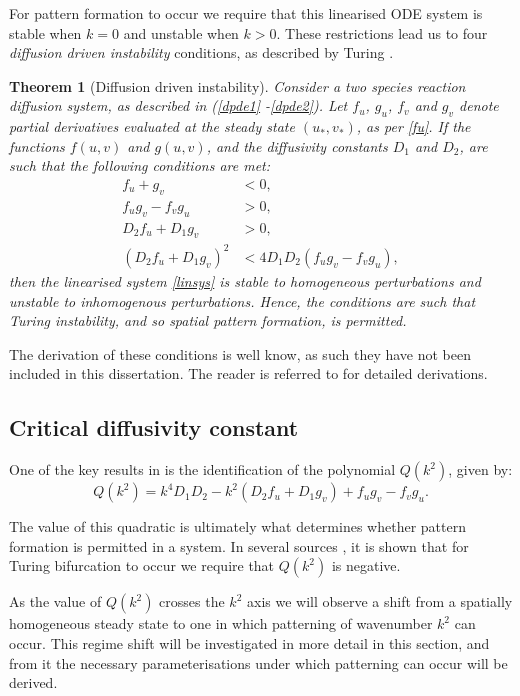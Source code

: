 \documentclass[12pt]{article}
\newtheorem{theorem}{Theorem}[section]
\begin{document}
For pattern formation to occur we require that this linearised ODE system is stable when $k=0$ and unstable when $k>0$. These restrictions lead us to four \textit{diffusion driven instability} conditions, as described by Turing
\cite{Turing}.
\begin{theorem}[Diffusion driven instability]
Consider a two species reaction diffusion system, as described in (\ref{dpde1} -\ref{dpde2}). Let $f_u$, $g_u$, $f_v$ and $g_v$ denote partial derivatives evaluated at the steady state $(u_{\ast}, v_{\ast})$, as per \eqref{fu}. If the functions $f(u,v)$ and $g(u,v)$, and the diffusivity constants $D_1$ and $D_2$, are such that the following conditions are met:
\begin{align}
    \label{DDI1} f_u + g_v &< 0,\\
    \label{DDI2} f_ug_v - f_vg_u &> 0,\\
    \label{DDI3} D_2f_u + D_1g_v &> 0,\\
    \label{DDI4} (D_2f_u + D_1g_v)^2 &< 4D_1D_2(f_ug_v - f_vg_u),
\end{align}
then the linearised system \eqref{linsys} is stable to homogeneous perturbations and unstable to inhomogenous perturbations. Hence, the conditions are such that Turing instability, and so spatial pattern formation, is permitted. 
\end{theorem}
The derivation of these conditions is well know, as such they have not been included in this dissertation. The reader is referred to \cite{Britton, Murray} for detailed derivations. 

\subsection{Critical diffusivity constant}
One of the key results in \cite{Turing} is the identification of the polynomial $Q(k^2)$, given by:
\begin{equation}\label{Qk2}
    Q(k^2) = k^4D_1D_2 - k^2(D_2f_u + D_1g_v) + f_ug_v - f_vg_u.
\end{equation}

The value of this quadratic is ultimately what determines whether pattern formation is permitted in a system. In several sources \cite{Britton, Murray, Turing}, it is shown that for Turing bifurcation to occur we require that $Q(k^2)$ is negative.

As the value of $Q(k^2)$ crosses the $k^2$ axis we will observe a shift from a spatially homogeneous steady state to one in which patterning of wavenumber $k^2$ can occur. This regime shift will be investigated in more detail in this section, and from it the necessary parameterisations under which patterning can occur will be derived.
\end{document}
